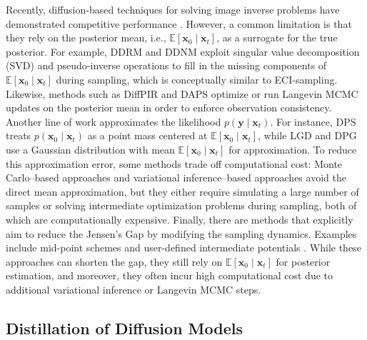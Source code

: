 \documentclass{article}
\theoremstyle{plain}
\theoremstyle{definition}
\theoremstyle{remark}
\def\vx{{\bm{x}}}
\def\vy{{\bm{y}}}
\begin{document}
Recently, diffusion-based techniques for solving image inverse problems have demonstrated competitive performance \cite{benchmark}. However, a common limitation is that they rely on the posterior mean, i.e., $\mathbb{E}[\vx_0 \mid \vx_t]$, as a surrogate for the true posterior. For example, DDRM \cite{ddrm} and DDNM \cite{ddnm} exploit singular value decomposition (SVD) and pseudo-inverse operations to fill in the missing components of $\mathbb{E}[\vx_0 \mid \vx_t]$ during sampling, which is conceptually similar to ECI-sampling. Likewise, methods such as DiffPIR \cite{diffpir} and DAPS \cite{daps} optimize or run Langevin MCMC updates on the posterior mean in order to enforce observation consistency. Another line of work approximates the likelihood $p(\vy \mid \vx_t)$. For instance, DPS \cite{chung2022dps} treats $p(\vx_0 \mid \vx_t)$ as a point mass centered at $\mathbb{E}[\vx_0 \mid \vx_t]$, while LGD \cite{LGD} and DPG \cite{DPG} use a Gaussian distribution with mean $\mathbb{E}[\vx_0 \mid \vx_t]$ for approximation. To reduce this approximation error, some methods trade off computational cost: Monte Carlo–based approaches \cite{fps, mcgdiff, scg} and variational inference–based approaches \cite{pnp-dm} avoid the direct mean approximation, but they either require simulating a large number of samples or solving intermediate optimization problems during sampling, both of which are computationally expensive. Finally, there are methods that explicitly aim to reduce the Jensen’s Gap by modifying the sampling dynamics. Examples include mid-point schemes \cite{midpoint} and user-defined intermediate potentials \cite{dcdpm}. While these approaches can shorten the gap, they still rely on $\mathbb{E}[\vx_0 \mid \vx_t]$ for posterior estimation, and moreover, they often incur high computational cost due to additional variational inference or Langevin MCMC steps.


\subsection{Distillation of Diffusion Models}
\end{document}

